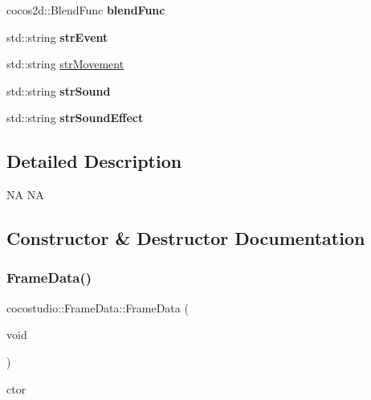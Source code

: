 \begin{DoxyCompactItemize}
\mbox{\label{classcocostudio_1_1FrameData_aaf62f0e9e1f12d80e9e19ccafe0709eb}} 
cocos2d\+::\+Blend\+Func {\bfseries blend\+Func}
\item 
\mbox{\label{classcocostudio_1_1FrameData_abc32c9e95478f09116717a1acd855278}} 
std\+::string {\bfseries str\+Event}
\item 
std\+::string \hyperlink{classcocostudio_1_1FrameData_ac6222bebecd83e9b9a483375d2df0cb8}{str\+Movement}
\item 
\mbox{\label{classcocostudio_1_1FrameData_abdaf729da4d1e4495a186f0853011ebd}} 
std\+::string {\bfseries str\+Sound}
\item 
\mbox{\label{classcocostudio_1_1FrameData_abe2b484b3b1169390a6288c081e040ee}} 
std\+::string {\bfseries str\+Sound\+Effect}
\end{DoxyCompactItemize}


\subsection{Detailed Description}
NA  NA 

\subsection{Constructor \& Destructor Documentation}
\mbox{\label{classcocostudio_1_1FrameData_a224567ed5169fb6c65a4d40d643784a7}} 
\subsubsection{\texorpdfstring{Frame\+Data()}{FrameData()}\hspace{0.1cm}{\footnotesize\ttfamily [1/2]}}
{\footnotesize\ttfamily cocostudio\+::\+Frame\+Data\+::\+Frame\+Data (\begin{DoxyParamCaption}\item[{void}]{ }\end{DoxyParamCaption})}

ctor \mbox{\label{classcocostudio_1_1FrameData_a89fdb7ff847e4e7d17624635feaaabe3}} 
